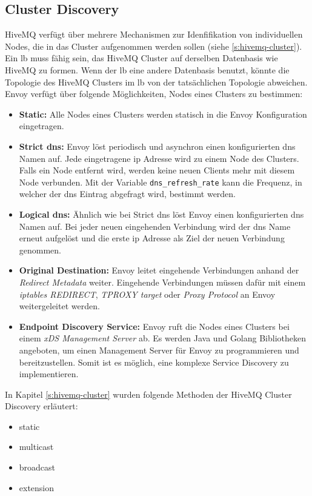 \subsection{Cluster Discovery} \label{ss:cluster-discovery}
HiveMQ verfügt über mehrere Mechanismen zur Idenfifikation von individuellen Nodes, die in das Cluster aufgenommen werden sollen (siehe \ref{s:hivemq-cluster}).
Ein \acl{lb} muss fähig sein, das HiveMQ Cluster auf derselben Datenbasis wie HiveMQ zu formen.
Wenn der \ac{lb} eine andere Datenbasis benutzt, könnte die Topologie des HiveMQ Clusters im \ac{lb} von der tatsächlichen Topologie abweichen.\\
Envoy verfügt über folgende Möglichkeiten, Nodes eines Clusters zu bestimmen:
\begin{itemize}
  \item \textbf{Static:} Alle Nodes eines Clusters werden statisch in die Envoy Konfiguration eingetragen.
  \item \textbf{Strict \ac{dns}:} Envoy löst periodisch und asynchron einen konfigurierten \ac{dns} Namen auf. Jede eingetragene \ac{ip} Adresse wird zu einem Node des Clusters. Falls ein Node entfernt wird, werden keine neuen Clients mehr mit diesem Node verbunden. Mit der Variable \verb|dns_refresh_rate| kann die Frequenz, in welcher der \ac{dns} Eintrag abgefragt wird, bestimmt werden.
  \item \textbf{Logical \ac{dns}:} Ähnlich wie bei Strict \ac{dns} löst Envoy einen konfigurierten \ac{dns} Namen auf. Bei jeder neuen eingehenden Verbindung wird der \ac{dns} Name erneut aufgelöst und die erste \ac{ip} Adresse als Ziel der neuen Verbindung genommen.
  \item \textbf{Original Destination:} Envoy leitet eingehende Verbindungen anhand der \textit{Redirect Metadata} weiter. Eingehende Verbindungen müssen dafür mit einem \textit{iptables REDIRECT}, \textit{TPROXY target} oder \textit{Proxy Protocol} an Envoy weitergeleitet werden.
  \item \textbf{Endpoint Discovery Service:} Envoy ruft die Nodes eines Clusters bei einem \textit{xDS Management Server} ab. Es werden Java und Golang Bibliotheken angeboten, um einen Management Server für Envoy zu programmieren und bereitzustellen. Somit ist es möglich, eine komplexe Service Discovery zu implementieren.
\end{itemize}
\cite{ServiceDiscoveryEnvoy}
In Kapitel \ref{s:hivemq-cluster} wurden folgende Methoden der HiveMQ Cluster Discovery erläutert:
\begin{itemize}
  \item static
  \item multicast
  \item broadcast
  \item extension
\end{itemize}
